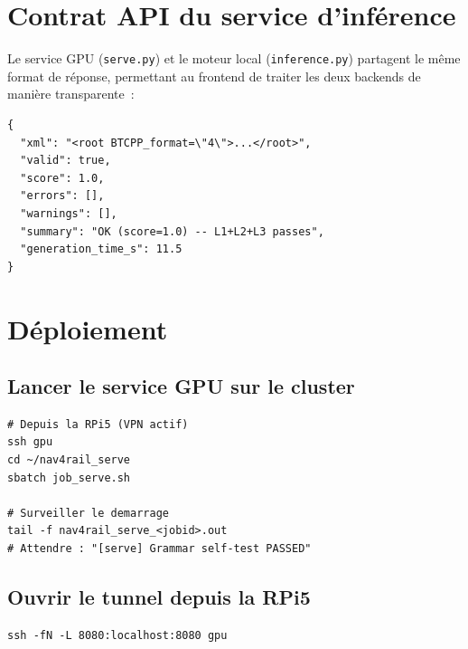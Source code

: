 \documentclass[a4paper,11pt]{article}
\newcommand{\file}[1]{\texttt{#1}}
\begin{document}
\section{Contrat API du service d'inférence}
\label{sec:api-contract}

Le service GPU (\file{serve.py}) et le moteur local (\file{inference.py})
partagent le même format de réponse, permettant au frontend de traiter les
deux backends de manière transparente~:

\begin{lstlisting}[style=json, caption={Format de réponse commun aux deux backends}]
{
  "xml": "<root BTCPP_format=\"4\">...</root>",
  "valid": true,
  "score": 1.0,
  "errors": [],
  "warnings": [],
  "summary": "OK (score=1.0) -- L1+L2+L3 passes",
  "generation_time_s": 11.5
}
\end{lstlisting}

\section{Déploiement}
\label{sec:deployment}

\subsection{Lancer le service GPU sur le cluster}

\begin{lstlisting}[style=bash, caption={Soumission du job SLURM depuis la RPi5}]
# Depuis la RPi5 (VPN actif)
ssh gpu
cd ~/nav4rail_serve
sbatch job_serve.sh

# Surveiller le demarrage
tail -f nav4rail_serve_<jobid>.out
# Attendre : "[serve] Grammar self-test PASSED"
\end{lstlisting}

\subsection{Ouvrir le tunnel depuis la RPi5}

\begin{lstlisting}[style=bash]
ssh -fN -L 8080:localhost:8080 gpu
\end{lstlisting}
\end{document}
